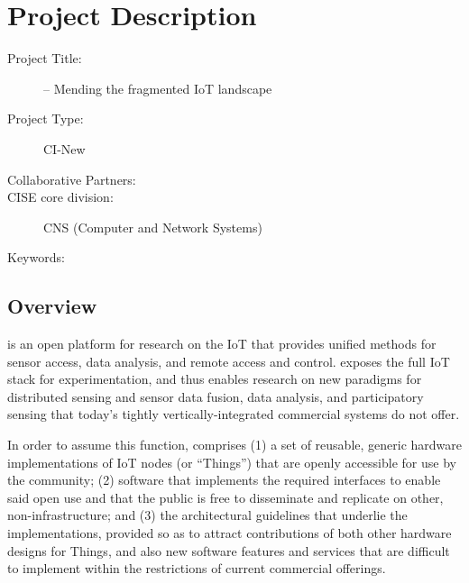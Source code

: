 
\section{Project Description}


\begin{description}
  \item[Project Title:] \sysname -- Mending the fragmented \acrshort{IoT} landscape
  \item[Project Type:] CI-New 
  \item[Collaborative Partners:] 
  \item[CISE core division:] CNS (Computer and Network Systems)
  \item[Keywords:] 
\end{description}


\subsection{Overview}

\sysname is an open platform for research on the \acrfull{IoT}
that provides unified methods for sensor access, data analysis,
and remote access and control. \sysname exposes the full \gls{IoT}
stack for experimentation, and thus enables research on new paradigms
for distributed sensing and sensor data fusion, data analysis, and
participatory sensing that today's tightly vertically-integrated
commercial systems do not offer.

In order to assume this function, \sysname comprises
(1) a set of reusable, generic hardware implementations of
\gls{IoT} nodes (or ``Things'') that are openly accessible for
use by the community;
(2) software that implements the required interfaces to
enable said open use and that the public is free to disseminate
and replicate on other, non-\sysname infrastructure; and
(3) the architectural guidelines that underlie the implementations,
provided so as to attract contributions of both other hardware
designs for Things, and also new software features and services
that are difficult to implement within the restrictions of current
commercial offerings.\\



